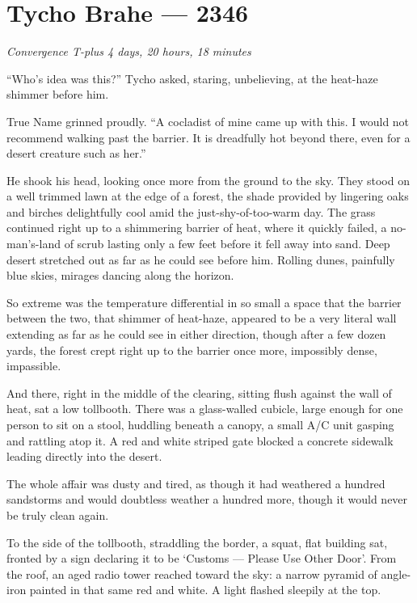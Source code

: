 \hypertarget{tycho-brahe-2346}{%
\chapter{Tycho Brahe — 2346}}

\begin{center}
\emph{Convergence T-plus 4 days, 20 hours, 18 minutes}
\end{center}

\noindent ``Who's idea was this?'' Tycho asked, staring, unbelieving, at the heat-haze shimmer before him.

True Name grinned proudly. ``A cocladist of mine came up with this. I would not recommend walking past the barrier. It is dreadfully hot beyond there, even for a desert creature such as her.''

He shook his head, looking once more from the ground to the sky. They stood on a well trimmed lawn at the edge of a forest, the shade provided by lingering oaks and birches delightfully cool amid the just-shy-of-too-warm day. The grass continued right up to a shimmering barrier of heat, where it quickly failed, a no-man's-land of scrub lasting only a few feet before it fell away into sand. Deep desert stretched out as far as he could see before him. Rolling dunes, painfully blue skies, mirages dancing along the horizon.

So extreme was the temperature differential in so small a space that the barrier between the two, that shimmer of heat-haze, appeared to be a very literal wall extending as far as he could see in either direction, though after a few dozen yards, the forest crept right up to the barrier once more, impossibly dense, impassible.

And there, right in the middle of the clearing, sitting flush against the wall of heat, sat a low tollbooth. There was a glass-walled cubicle, large enough for one person to sit on a stool, huddling beneath a canopy, a small A/C unit gasping and rattling atop it. A red and white striped gate blocked a concrete sidewalk leading directly into the desert.

The whole affair was dusty and tired, as though it had weathered a hundred sandstorms and would doubtless weather a hundred more, though it would never be truly clean again.

To the side of the tollbooth, straddling the border, a squat, flat building sat, fronted by a sign declaring it to be `Customs — Please Use Other Door'. From the roof, an aged radio tower reached toward the sky: a narrow pyramid of angle-iron painted in that same red and white. A light flashed sleepily at the top.

